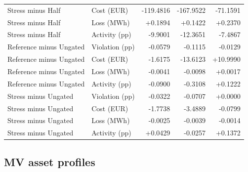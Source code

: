 \documentclass[11pt]{article}
\begin{document}
\begin{longtable}{llrrr}
Stress minus Half & Cost (EUR) & -119.4816 & -167.9522 & -71.1591\\
Stress minus Half & Loss (MWh) & +0.1894 & +0.1422 & +0.2370\\
Stress minus Half & Activity (pp) & -9.9001 & -12.3651 & -7.4867\\
Reference minus Ungated & Violation (pp) & -0.0579 & -0.1115 & -0.0129\\
Reference minus Ungated & Cost (EUR) & -1.6175 & -13.6123 & +10.9990\\
Reference minus Ungated & Loss (MWh) & -0.0041 & -0.0098 & +0.0017\\
Reference minus Ungated & Activity (pp) & -0.0900 & -0.3108 & +0.1222\\
Stress minus Ungated & Violation (pp) & -0.0322 & -0.0707 & +0.0000\\
Stress minus Ungated & Cost (EUR) & -1.7738 & -3.4889 & -0.0799\\
Stress minus Ungated & Loss (MWh) & -0.0025 & -0.0039 & -0.0014\\
Stress minus Ungated & Activity (pp) & +0.0429 & -0.0257 & +0.1372\\
\end{longtable}\normalsize
{}\subsection{MV asset profiles}
\end{document}
